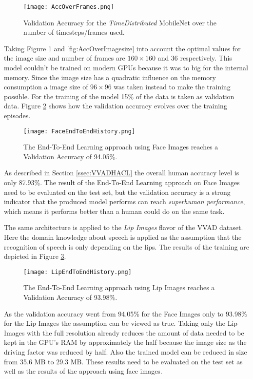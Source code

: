 \begin{figure}
  \centering
  \texttt{[image: AccOverFrames.png]}
  \caption{Validation Accuracy for the \emph{TimeDistributed} MobileNet over the number of timesteps/frames used.}
  \label{fig:AccTimeStepsMobile}
\end{figure}

Taking Figure \ref{fig:AccTimeStepsMobile} and \ref{fig:AccOverImagesize} into account the optimal values for the image size and number of frames are $160 \times 160$ and 36 respectively.
This model couldn't be trained on modern GPUs because it was to big for the internal memory. 
Since the image size has a quadratic influence on the memory consumption a image size of $96 \times 96$ was taken instead to make the training possible.
For the training of the model 15\% of the data is taken as validation data.
Figure \ref{fig:FaceEndToEndHistory} shows how the validation accuracy evolves over the training episodes.

\begin{figure}
  \centering
  \texttt{[image: FaceEndToEndHistory.png]}
  \caption{The End-To-End Learning approach using Face Images reaches a Validation Accuracy of 94.05\%.}
  \label{fig:FaceEndToEndHistory}
\end{figure}

As described in Section \ref{ssec:VVADHACL} the overall human accuracy level is only 87.93\%.
The result of the End-To-End Learning approach on Face Images need to be evaluated on the test set, but the validation accuracy is a strong indicator that the produced model performs can reach \emph{superhuman performance}, which means it performs better than a human could do on the same task.

The same architecture is applied to the \emph{Lip Images} flavor of the VVAD dataset.
Here the domain knowledge about speech is applied as the assumption that the recognition of speech is only depending on the lips.
The results of the training are depicted in Figure \ref{fig:LipEndToEndHistory}.

\begin{figure}
  \centering
  \texttt{[image: LipEndToEndHistory.png]}
  \caption{The End-To-End Learning approach using Lip Images reaches a Validation Accuracy of 93.98\%.}
  \label{fig:LipEndToEndHistory}
\end{figure}
As the validation accuracy went from 94.05\% for the Face Images only to 93.98\% for the Lip Images the assumption can be viewed as true. 
Taking only the Lip Images with the full resolution already reduces the amount of data needed to be kept in the GPU's RAM by approximately the half because the image size as the driving factor was reduced by half.
Also the trained model can be reduced in size from 35.6 MB to 29.3 MB.
These results need to be evaluated on the test set as well as the results of the approach using face images.

